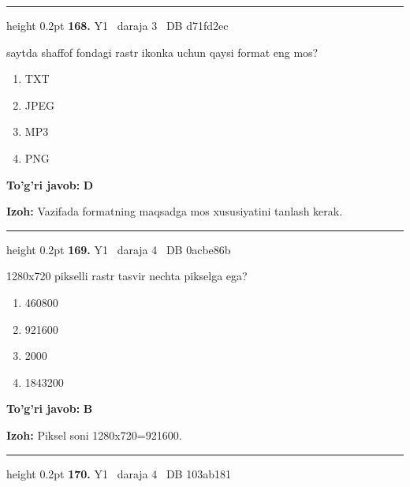 \documentclass[10pt,a4paper,oneside]{article}
\begin{document}
\vspace{2mm}\hrule height 0.2pt \vspace{4mm}
\hypertarget{q168}{\textbf{\color{ink}168.}}  {\color{muted}\scriptsize Y1 \textbullet\ daraja 3 \textbullet\ DB d71fd2ec}
\par
saytda shaffof fondagi rastr ikonka uchun qaysi format eng mos?
\begin{enumerate}[label=\Alph*),leftmargin=9mm]
\item TXT
\item JPEG
\item MP3
\item PNG
\end{enumerate}
\begin{tcolorbox}[enhanced,breakable,colback=teal!4,colframe=teal!45!black,boxrule=0.45pt,arc=1.2mm,left=2.8mm,right=2.8mm,top=2mm,bottom=2mm,before skip=2mm,after skip=2mm]
\textbf{\color{teal}To'g'ri javob:} \textbf{D}
\par\smallskip
\textbf{Izoh:} Vazifada formatning maqsadga mos xususiyatini tanlash kerak.
\end{tcolorbox}
\vspace{2mm}\hrule height 0.2pt \vspace{4mm}
\hypertarget{q169}{\textbf{\color{ink}169.}}  {\color{muted}\scriptsize Y1 \textbullet\ daraja 4 \textbullet\ DB 0acbe86b}
\par
1280x720 pikselli rastr tasvir nechta pikselga ega?
\begin{enumerate}[label=\Alph*),leftmargin=9mm]
\item 460800
\item 921600
\item 2000
\item 1843200
\end{enumerate}
\begin{tcolorbox}[enhanced,breakable,colback=teal!4,colframe=teal!45!black,boxrule=0.45pt,arc=1.2mm,left=2.8mm,right=2.8mm,top=2mm,bottom=2mm,before skip=2mm,after skip=2mm]
\textbf{\color{teal}To'g'ri javob:} \textbf{B}
\par\smallskip
\textbf{Izoh:} Piksel soni 1280x720=921600.
\end{tcolorbox}
\vspace{2mm}\hrule height 0.2pt \vspace{4mm}
\hypertarget{q170}{\textbf{\color{ink}170.}}  {\color{muted}\scriptsize Y1 \textbullet\ daraja 4 \textbullet\ DB 103ab181}
\par
\end{document}
